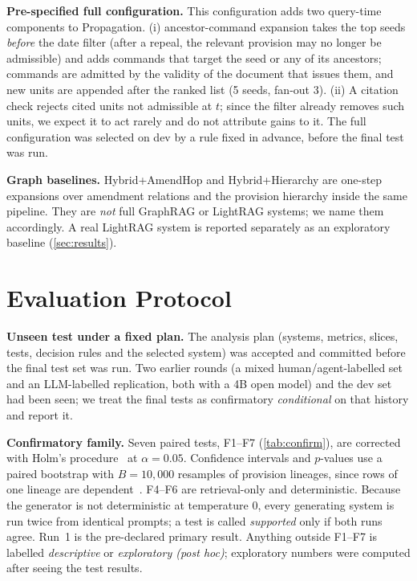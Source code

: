 \documentclass[conference]{IEEEtran}
\newcommand{\sys}[1]{\textsf{#1}}
\begin{document}
\textbf{Pre-specified full configuration.} This configuration adds two query-time components to \sys{Propagation}. (i) ancestor-command expansion takes the top seeds \emph{before} the date filter (after a repeal, the relevant provision may no longer be admissible) and adds commands that target the seed or any of its ancestors; commands are admitted by the validity of the document that issues them, and new units are appended after the ranked list (5 seeds, fan-out 3). (ii) A citation check rejects cited units not admissible at $t$; since the filter already removes such units, we expect it to act rarely and do not attribute gains to it. The full configuration was selected on dev by a rule fixed in advance, before the final test was run.

\textbf{Graph baselines.} \sys{Hybrid+AmendHop} and \sys{Hybrid+Hierarchy} are one-step expansions over amendment relations and the provision hierarchy inside the same pipeline. They are \emph{not} full GraphRAG or LightRAG systems; we name them accordingly. A real LightRAG system is reported separately as an exploratory baseline (\cref{sec:results}).

\section{Evaluation Protocol}
\label{sec:protocol}

\textbf{Unseen test under a fixed plan.} The analysis plan (systems, metrics, slices, tests, decision rules and the selected system) was accepted and committed before the final test set was run. Two earlier rounds (a mixed human/agent-labelled set and an LLM-labelled replication, both with a 4B open model) and the dev set had been seen; we treat the final tests as confirmatory \emph{conditional} on that history and report it.

\textbf{Confirmatory family.} Seven paired tests, F1--F7 (\cref{tab:confirm}), are corrected with Holm's procedure~\cite{holm1979} at $\alpha=0.05$. Confidence intervals and $p$-values use a paired bootstrap with $B=10{,}000$ resamples of provision lineages, since rows of one lineage are dependent~\cite{dror2018hitchhiker}. F4--F6 are retrieval-only and deterministic. Because the generator is not deterministic at temperature 0, every generating system is run twice from identical prompts; a test is called \emph{supported} only if both runs agree. Run~1 is the pre-declared primary result. Anything outside F1--F7 is labelled \emph{descriptive} or \emph{exploratory (post hoc)}; exploratory numbers were computed after seeing the test results.
\end{document}

